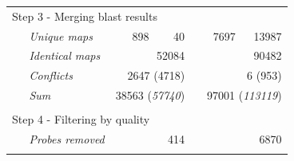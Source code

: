 \begin{table}
\begin{threeparttable}
\begin{footnotesize}
\begin{tabular}{@{}p{3cm}r|rcr|r}
		\multicolumn{6}{l}{Step 3 - Merging blast results\tnote{8}} \\[.2ex]
	{\it ~~~Unique maps\tnote{9}} & 898 & 40 && 7697 & 13987 \\
	{\it ~~~Identical maps\tnote{10}} & 
			\multicolumn{2}{r}{52084} && \multicolumn{2}{r}{90482} \\
	{\it ~~~Conflicts\tnote{11}} & 
			\multicolumn{2}{r}{2647 (4718)} && \multicolumn{2}{r}{6 (953)} \\
	{\it ~~~Sum\tnote{12}} & 
			\multicolumn{2}{r}{38563 (\textit{57740})} && 
			\multicolumn{2}{r}{97001 (\textit{113119})} \\

	\multicolumn{6}{l}{}\\

		\multicolumn{6}{l}{Step 4 - Filtering by quality} \\[.2ex]
	{\it ~~~Probes removed} & \multicolumn{2}{r}{414} && 
			\multicolumn{2}{r}{6870} \\

	\multicolumn{6}{l}{}\\
		

\end{tabular}
\end{footnotesize}
\end{threeparttable}
\end{table}
